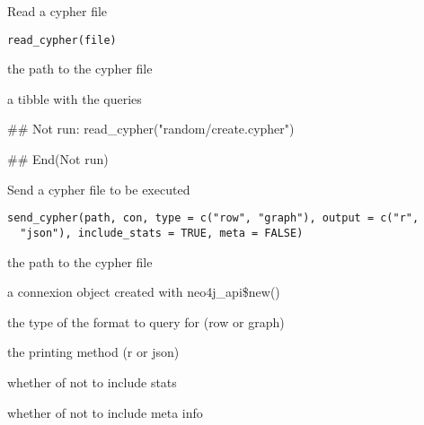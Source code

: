 \documentclass[a4paper]{book}
\begin{document}
%
\begin{Examples}
\end{Examples}
%
\begin{Description}\relax
Read a cypher file
\end{Description}
%
\begin{Usage}
\begin{verbatim}
read_cypher(file)
\end{verbatim}
\end{Usage}
%
\begin{Arguments}
\begin{ldescription}
\item[\code{file}] the path to the cypher file
\end{ldescription}
\end{Arguments}
%
\begin{Value}
a tibble with the queries
\end{Value}
%
\begin{Examples}
\begin{ExampleCode}
## Not run: 
read_cypher("random/create.cypher")

## End(Not run)
\end{ExampleCode}
\end{Examples}
%
\begin{Description}\relax
Send a cypher file to be executed
\end{Description}
%
\begin{Usage}
\begin{verbatim}
send_cypher(path, con, type = c("row", "graph"), output = c("r",
  "json"), include_stats = TRUE, meta = FALSE)
\end{verbatim}
\end{Usage}
%
\begin{Arguments}
\begin{ldescription}
\item[\code{path}] the path to the cypher file

\item[\code{con}] a connexion object created with neo4j\_api\$new()

\item[\code{type}] the type of the format to query for (row or graph)

\item[\code{output}] the printing method (r or json)

\item[\code{include\_stats}] whether of not to include stats

\item[\code{meta}] whether of not to include meta info
\end{ldescription}
\end{Arguments}
\end{document}
